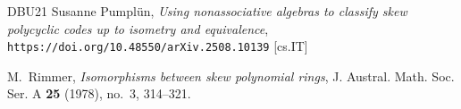 \documentclass[11pt]{amsart}
\theoremstyle{plain}
\theoremstyle{definition}
\numberwithin{equation}{section}
\numberwithin{figure}{section}
\begin{document}
\begin{thebibliography}{DBU{\etalchar{+}}21}
Susanne Pumpl\"un, \emph{Using nonassociative algebras to classify skew polycyclic codes up to isometry and equivalence},
\verb#https://doi.org/10.48550/arXiv.2508.10139# [cs.IT]

M.~Rimmer, \emph{Isomorphisms between skew polynomial rings}, J. Austral. Math. Soc. Ser. A \textbf{25} (1978), no.~3, 314--321. 




\end{thebibliography}
\end{document}
